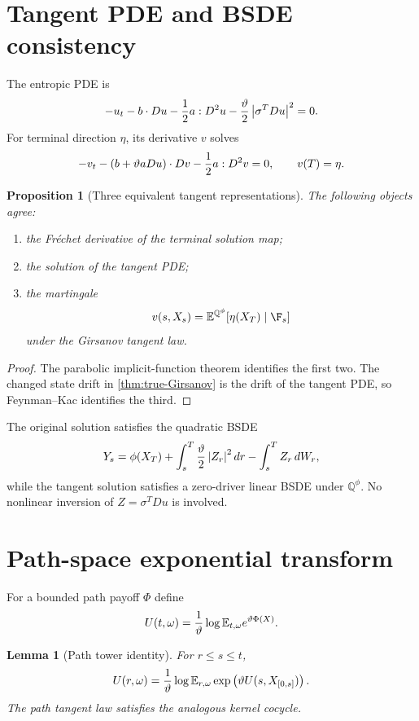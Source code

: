 \documentclass[11pt,reqno]{amsart}
\newtheorem{lemma}[theorem]{Lemma}
\newtheorem{proposition}[theorem]{Proposition}
\theoremstyle{definition}
\newcommand{\E}{\mathbb E}
\newcommand{\Qp}{\mathbb Q}
\newcommand{\abs}[1]{\left\lvert#1\right\rvert}
\begin{document}
\section{Tangent PDE and BSDE consistency}

The entropic PDE is
\[
 -u_t-b\cdot Du-{1\over2}a:D^2u
 -{\vartheta\over2}\abs{\sigma^TDu}^2=0.
\]
For terminal direction $\eta$, its derivative $v$ solves
\[
 -v_t-(b+\vartheta aDu)\cdot Dv-{1\over2}a:D^2v=0,
 \qquad v(T)=\eta.
\]

\begin{proposition}[Three equivalent tangent representations]\label{prop:three-tangents}
The following objects agree:
\begin{enumerate}
\item the Fr\'echet derivative of the terminal solution map;
\item the solution of the tangent PDE;
\item the martingale
\[
 v(s,X_s)=\E^{\Qp^\phi}[\eta(X_T)\mid\F_s]
\]
under the Girsanov tangent law.
\end{enumerate}
\end{proposition}

\begin{proof}
The parabolic implicit-function theorem identifies the first two.  The changed
state drift in \cref{thm:true-Girsanov} is the drift of the tangent PDE, so
Feynman--Kac identifies the third.
\end{proof}

The original solution satisfies the quadratic BSDE
\[
 Y_s=\phi(X_T)+\int_s^T{\vartheta\over2}\abs{Z_r}^2dr
 -\int_s^TZ_r\,dW_r,
\]
while the tangent solution satisfies a zero-driver linear BSDE under
$\Qp^\phi$.  No nonlinear inversion of $Z=\sigma^TDu$ is involved.

\section{Path-space exponential transform}

For a bounded path payoff $\Phi$ define
\[
 U(t,\omega)={1\over\vartheta}\log
 \E_{t,\omega}e^{\vartheta\Phi(X)}.
\]

\begin{lemma}[Path tower identity]\label{lem:path-tower}
For $r\le s\le t$,
\[
 U(r,\omega)=
 {1\over\vartheta}\log
 \E_{r,\omega}
 \exp\left(\vartheta U(s,X_{[0,s]})\right).
\]
The path tangent law satisfies the analogous kernel cocycle.
\end{lemma}
\end{document}
